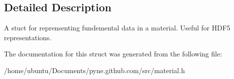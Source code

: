 \subsection{Detailed Description}
A stuct for reprensenting fundemental data in a material. Useful for H\+D\+F5 representations. 

The documentation for this struct was generated from the following file\+:\begin{DoxyCompactItemize}
\item 
/home/ubuntu/\+Documents/pyne.\+github.\+com/src/material.\+h\end{DoxyCompactItemize}
